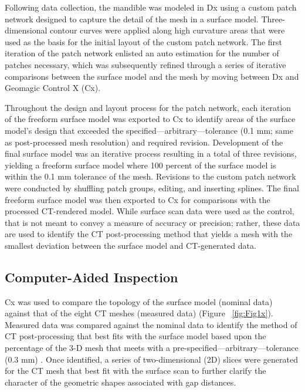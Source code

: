 \documentclass[review]{elsarticle}
\begin{document}
\newpage
Following data collection, the mandible was modeled in Dx using a custom patch network designed to capture the detail of the mesh in a surface model. Three-dimensional contour curves were applied along high curvature areas that were used as the basis for the initial layout of the custom patch network. The first iteration of the patch network enlisted an auto estimation for the number of patches necessary, which was subsequently refined through a series of iterative comparisons between the surface model and the mesh by moving between Dx and Geomagic Control X (Cx).

Throughout the design and layout process for the patch network, each iteration of the freeform surface model was exported to Cx to identify areas of the surface model's design that exceeded the specified---arbitrary---tolerance (0.1 mm; same as post-processed mesh resolution) and required revision. Development of the final surface model was an iterative process resulting in a total of three revisions, yielding a freeform surface model where 100 percent of the surface model is within the  0.1 mm tolerance of the mesh. Revisions to the custom patch network were conducted by shuffling patch groups, editing, and inserting splines. The final freeform surface model was then exported to Cx for comparisons with the processed CT-rendered model. While surface scan data were used as the control, that is not meant to convey a measure of accuracy or precision; rather, these data are used to identify the CT post-processing method that yields a mesh with the smallest deviation between the surface model and CT-generated data.

\subsection{Computer-Aided Inspection}

Cx was used to compare the topology of the surface model (nominal data) against that of the eight CT meshes (measured data) \citep{RN11473,sj2021} (Figure ~\ref{fig:Fig1x}). Measured data was compared against the nominal data \citep{RN11463,RN5923,RN11460,RN11465} to identify the method of CT post-processing that best fits with the surface model based upon the percentage of the 3-D mesh that meets with a pre-specified---arbitrary---tolerance (0.3 mm) \citep{RN5925,RN11471,RN11455}. Once identified, a series of two-dimensional (2D) slices were generated for the CT mesh that best fit with the surface scan to further clarify the character of the geometric shapes associated with gap distances.
\end{document}
